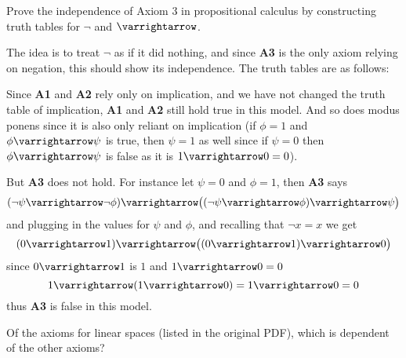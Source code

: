 \documentclass[10pt]{article}
\let\to=\varrightarrow
\def\bexerc{\begin{exercise*}}
\def\eexerc{\end{exercise*}}
\def\bblank{\begin{blankpp}}
\def\eblank{\end{blankpp}}
\begin{document}


\bigskip

\bexerc

    Prove the independence of Axiom $3$ in propositional calculus by constructing truth tables for $\neg$ and $\to$.

\eexerc

\bblank

    The idea is to treat $\neg$ as if it did nothing, and since \textbf{A3} is the only axiom relying on negation, this should show its independence.
    The truth tables are as follows:

    \centerline{%
        \qquad
        \vtop{\halign{\strut\hfil\;$#$\;\hfil&&\vrule\hfil\;$#$\;\hfil\cr
            A & B & A\to B\cr\noalign{\hrule}
            0 & 0 & 1 \cr
            0 & 1 & 1 \cr
            1 & 0 & 0 \cr
            1 & 1 & 1 \cr
        }}%
    }

    Since \textbf{A1} and \textbf{A2} rely only on implication, and we have not changed the  truth table of implication, \textbf{A1} and \textbf{A2} still hold true in this model.
    And so does modus ponens since it is also only reliant on implication (if $\phi=1$ and $\phi\to\psi$ is true, then $\psi=1$ as well since if $\psi=0$ then $\phi\to\psi$ is false as it is $1\to0=0$).

    But \textbf{A3} does not hold.
    For instance let $\psi=0$ and $\phi=1$, then \textbf{A3} says
    \[ (\neg\psi\to\neg\phi)\to\bigl((\neg\psi\to\phi)\to\psi\bigr) \]
    and plugging in the values for $\psi$ and $\phi$, and recalling that $\neg x=x$ we get
    \[ (0\to1)\to\bigl((0\to1)\to0\bigr) \]
    since $0\to1$ is $1$ and $1\to0=0$
    \[ 1\to(1\to0) = 1\to0 = 0 \]
    thus \textbf{A3} is false in this model.

\eblank

\bexerc

    Of the axioms for linear spaces (listed in the original PDF), which is dependent of the other axioms?

\eexerc
\end{document}
